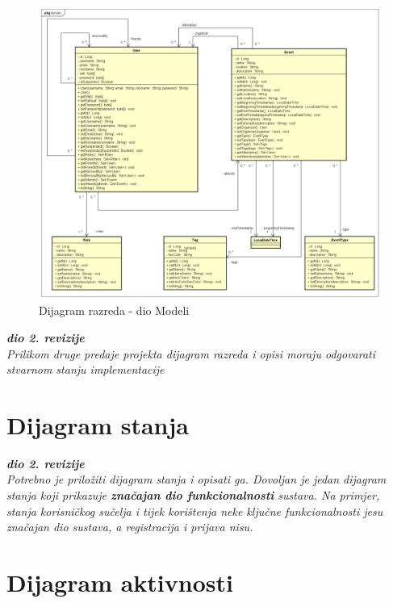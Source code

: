 			\begin{figure}[h]
				\includegraphics[width=\textwidth]{dijagrami/UML modeli.png}
				\caption{Dijagram razreda - dio Modeli}
			\end{figure}
		
			\iffalse
			
				\textbf{\textit{dio 2. revizije}}\\			
			
				\textit{Prilikom druge predaje projekta dijagram razreda i opisi moraju odgovarati stvarnom stanju implementacije}
			
			
			
				\eject
		
			\section{Dijagram stanja}
			
			
				\textbf{\textit{dio 2. revizije}}\\
			
				\textit{Potrebno je priložiti dijagram stanja i opisati ga. Dovoljan je jedan dijagram stanja koji prikazuje \textbf{značajan dio funkcionalnosti} sustava. Na primjer, stanja korisničkog sučelja i tijek korištenja neke ključne funkcionalnosti jesu značajan dio sustava, a registracija i prijava nisu. }
			
			
				\eject 
		
			\section{Dijagram aktivnosti}
			
